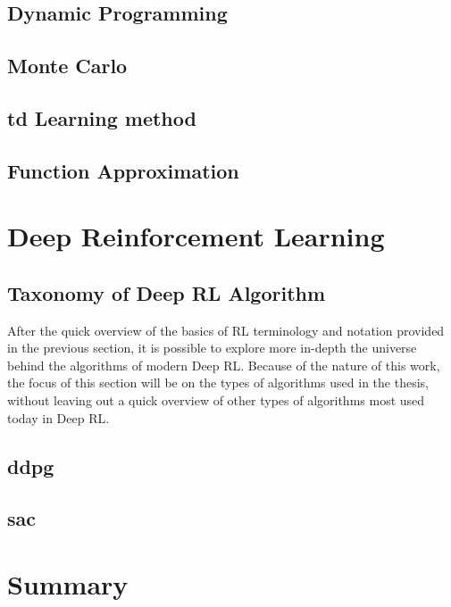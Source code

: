 
\subsection{Dynamic Programming}

\subsection{Monte Carlo}

\subsection{\acrshort{td} Learning method}

\subsection{Function Approximation}

\section{Deep Reinforcement Learning}

\subsection{Taxonomy of Deep RL Algorithm}

After the quick overview of the basics of RL terminology and notation provided in the previous section, it is possible to explore more in-depth the universe behind the algorithms of modern Deep RL. Because of the nature of this work, the focus of this section will be on the types of algorithms used in the thesis, without leaving out a quick overview of other types of algorithms most used today in Deep RL.

\subsection{\acrfull{ddpg}}

\subsection{\acrfull{sac}}

\section{Summary}








